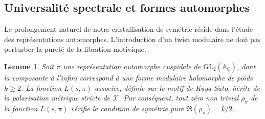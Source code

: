 \documentclass[
]{article}
\newtheorem{lemma}{Lemme}
\begin{document}
\subsection{Universalité spectrale et formes automorphes}

Le prolongement naturel de notre cristallisation de symétrie réside dans l'étude des représentations automorphes. L'introduction d'un twist modulaire ne doit pas perturber la pureté de la fibration motivique.

\begin{lemma}
Soit $\pi$ une représentation automorphe cuspidale de $\mathrm{GL}_2(\mathbb{A}_{\mathbb{Q}})$, dont la composante à l'infini correspond à une forme modulaire holomorphe de poids $k \ge 2$. La fonction $L(s, \pi)$ associée, définie sur le motif de Kuga-Sato, hérite de la polarisation métrique stricte de $\mathcal{X}$. Par conséquent, tout zéro non trivial $\rho_{\pi}$ de la fonction $L(s, \pi)$ vérifie la condition de symétrie pure $\Re(\rho_{\pi}) = k/2$.
\end{lemma}
\end{document}
